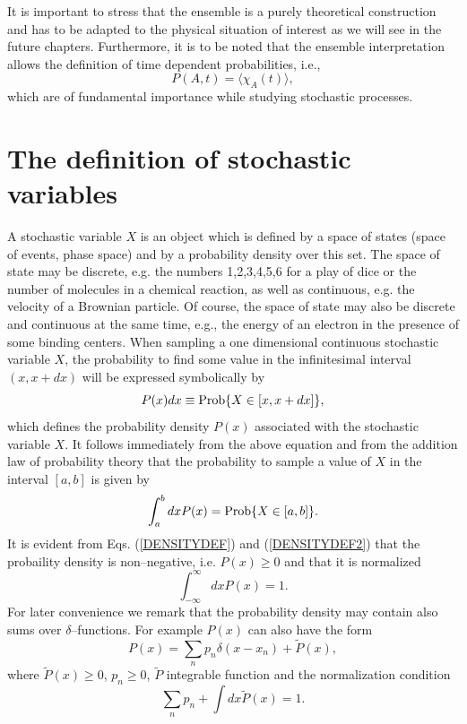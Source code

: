 It is important to stress that the
ensemble is a purely theoretical construction and has to be adapted 
to the physical situation of interest as we will see in the future chapters. 
Furthermore, it is to be noted that the ensemble 
interpretation  allows the definition of time dependent 
probabilities,
i.e.,
\begin{equation}
P(A,t) = \langle \chi_A(t) \rangle,
\end{equation}
which are of fundamental importance while studying stochastic 
processes.

\section{The definition of stochastic variables}
A stochastic variable $X$ is an object which is defined by a space 
of states (space of events, phase space) and by a probability 
density over this set. The space of state may be discrete, e.g. 
the numbers 1,2,3,4,5,6 for a play of dice or the number of 
molecules in a chemical reaction, as well as continuous, e.g.
the velocity of a Brownian particle. Of course, the space of state
may also be discrete and continuous at the same time, e.g., the
energy of an electron in the presence of some binding centers.
When sampling a one dimensional continuous stochastic variable $X$,
the probability to find some value in the infinitesimal interval
$(x,x+dx)$ will be expressed symbolically by
\begin{equation}\label{DENSITYDEF}
P(x) dx \equiv {\rm Prob} \{X\in [x,x+dx] \},
\end{equation}
which defines the probability density $P(x)$ associated with the 
stochastic variable $X$. It follows immediately from the above 
equation and from the addition law of
probability theory that the probability to sample a value of $X$
in the interval $[a,b]$ is given by
\begin{equation}\label{DENSITYDEF2}
\int_a^b dx P(x) = {\rm Prob}\{ X \in[a,b] \}.
\end{equation}
It is evident from Eqs. (\ref{DENSITYDEF}) and (\ref{DENSITYDEF2}) that 
the probaility density is non--negative, i.e. $P(x) \ge 0$ and 
that it is normalized
\begin{equation}
\int_{-\infty}^{\infty} dx P(x) = 1.
\end{equation}
For later convenience we remark that the probability density may 
contain also sums over $\delta$--functions. For example $P(x)$ can 
also have the form 
\begin{equation}
P(x) = \sum_n p_n \delta(x-x_n) + \tilde{P}(x),
\end{equation}
where
$\tilde{P}(x) \ge 0$, $p_n \ge 0$, $\tilde{P}$ integrable function 
and the normalization condition
\begin{equation}
\sum_n p_n + \int dx \tilde{P}(x) =1.
\end{equation}

